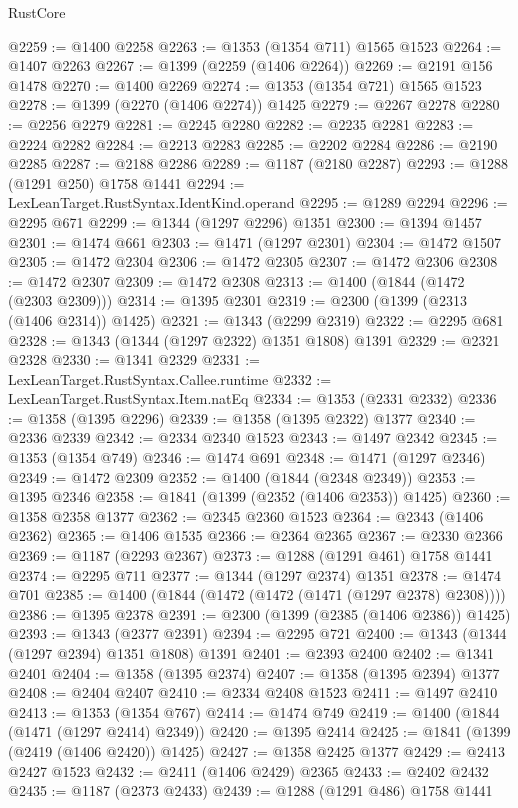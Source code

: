 \begin{lexlean}{RustCore}
\begin{coremodule}
@2259 := @1400 @2258
@2263 := @1353 (@1354 @711) @1565 @1523
@2264 := @1407 @2263
@2267 := @1399 (@2259 (@1406 @2264))
@2269 := @2191 @156 @1478
@2270 := @1400 @2269
@2274 := @1353 (@1354 @721) @1565 @1523
@2278 := @1399 (@2270 (@1406 @2274)) @1425
@2279 := @2267 @2278
@2280 := @2256 @2279
@2281 := @2245 @2280
@2282 := @2235 @2281
@2283 := @2224 @2282
@2284 := @2213 @2283
@2285 := @2202 @2284
@2286 := @2190 @2285
@2287 := @2188 @2286
@2289 := @1187 (@2180 @2287)
@2293 := @1288 (@1291 @250) @1758 @1441
@2294 := LexLeanTarget.RustSyntax.IdentKind.operand
@2295 := @1289 @2294
@2296 := @2295 @671
@2299 := @1344 (@1297 @2296) @1351
@2300 := @1394 @1457
@2301 := @1474 @661
@2303 := @1471 (@1297 @2301)
@2304 := @1472 @1507
@2305 := @1472 @2304
@2306 := @1472 @2305
@2307 := @1472 @2306
@2308 := @1472 @2307
@2309 := @1472 @2308
@2313 := @1400 (@1844 (@1472 (@2303 @2309)))
@2314 := @1395 @2301
@2319 := @2300 (@1399 (@2313 (@1406 @2314)) @1425)
@2321 := @1343 (@2299 @2319)
@2322 := @2295 @681
@2328 := @1343 (@1344 (@1297 @2322) @1351 @1808) @1391
@2329 := @2321 @2328
@2330 := @1341 @2329
@2331 := LexLeanTarget.RustSyntax.Callee.runtime
@2332 := LexLeanTarget.RustSyntax.Item.natEq
@2334 := @1353 (@2331 @2332)
@2336 := @1358 (@1395 @2296)
@2339 := @1358 (@1395 @2322) @1377
@2340 := @2336 @2339
@2342 := @2334 @2340 @1523
@2343 := @1497 @2342
@2345 := @1353 (@1354 @749)
@2346 := @1474 @691
@2348 := @1471 (@1297 @2346)
@2349 := @1472 @2309
@2352 := @1400 (@1844 (@2348 @2349))
@2353 := @1395 @2346
@2358 := @1841 (@1399 (@2352 (@1406 @2353)) @1425)
@2360 := @1358 @2358 @1377
@2362 := @2345 @2360 @1523
@2364 := @2343 (@1406 @2362)
@2365 := @1406 @1535
@2366 := @2364 @2365
@2367 := @2330 @2366
@2369 := @1187 (@2293 @2367)
@2373 := @1288 (@1291 @461) @1758 @1441
@2374 := @2295 @711
@2377 := @1344 (@1297 @2374) @1351
@2378 := @1474 @701
@2385 := @1400 (@1844 (@1472 (@1472 (@1471 (@1297 @2378) @2308))))
@2386 := @1395 @2378
@2391 := @2300 (@1399 (@2385 (@1406 @2386)) @1425)
@2393 := @1343 (@2377 @2391)
@2394 := @2295 @721
@2400 := @1343 (@1344 (@1297 @2394) @1351 @1808) @1391
@2401 := @2393 @2400
@2402 := @1341 @2401
@2404 := @1358 (@1395 @2374)
@2407 := @1358 (@1395 @2394) @1377
@2408 := @2404 @2407
@2410 := @2334 @2408 @1523
@2411 := @1497 @2410
@2413 := @1353 (@1354 @767)
@2414 := @1474 @749
@2419 := @1400 (@1844 (@1471 (@1297 @2414) @2349))
@2420 := @1395 @2414
@2425 := @1841 (@1399 (@2419 (@1406 @2420)) @1425)
@2427 := @1358 @2425 @1377
@2429 := @2413 @2427 @1523
@2432 := @2411 (@1406 @2429) @2365
@2433 := @2402 @2432
@2435 := @1187 (@2373 @2433)
@2439 := @1288 (@1291 @486) @1758 @1441

\end{coremodule}
\end{lexlean}
